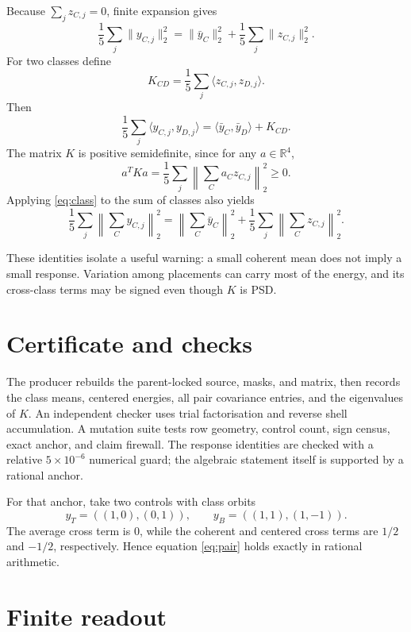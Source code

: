 \documentclass[10pt]{article}
\begin{document}
Because $\sum_jz_{C,j}=0$, finite expansion gives
\begin{equation}\label{eq:class}
 \frac15\sum_j\|y_{C,j}\|_2^2
 =\|\bar y_C\|_2^2+\frac15\sum_j\|z_{C,j}\|_2^2.
\end{equation}
For two classes define
\[
 K_{CD}=\frac15\sum_j\langle z_{C,j},z_{D,j}\rangle.
\]
Then
\begin{equation}\label{eq:pair}
 \frac15\sum_j\langle y_{C,j},y_{D,j}\rangle
 =\langle\bar y_C,\bar y_D\rangle+K_{CD}.
\end{equation}
The matrix $K$ is positive semidefinite, since for any $a\in\mathbb R^4$,
\[
 a^TKa=\frac15\sum_j\left\|\sum_Ca_Cz_{C,j}\right\|_2^2\geq0.
\]
Applying \eqref{eq:class} to the sum of classes also yields
\begin{equation}\label{eq:full}
 \frac15\sum_j\left\|\sum_Cy_{C,j}\right\|_2^2
 =\left\|\sum_C\bar y_C\right\|_2^2
 +\frac15\sum_j\left\|\sum_Cz_{C,j}\right\|_2^2.
\end{equation}

These identities isolate a useful warning: a small coherent mean does not
imply a small response.  Variation among placements can carry most of the
energy, and its cross-class terms may be signed even though $K$ is PSD.

\section{Certificate and checks}

The producer rebuilds the parent-locked source, masks, and matrix, then records
the class means, centered energies, all pair covariance entries, and the
eigenvalues of $K$.  An independent checker uses trial factorisation and
reverse shell accumulation.  A mutation suite tests row geometry, control
count, sign census, exact anchor, and claim firewall.  The response identities
are checked with a relative $5\times10^{-6}$ numerical guard; the algebraic
statement itself is supported by a rational anchor.

For that anchor, take two controls with class orbits
\[
 y_T=((1,0),(0,1)),\qquad y_B=((1,1),(1,-1)).
\]
The average cross term is $0$, while the coherent and centered cross terms are
$1/2$ and $-1/2$, respectively.  Hence equation \eqref{eq:pair} holds exactly
in rational arithmetic.

\section{Finite readout}
\end{document}
